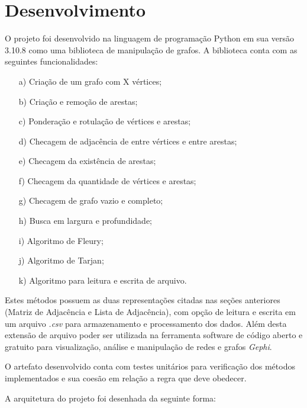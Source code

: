 \section{\esp Desenvolvimento}

O projeto foi desenvolvido na linguagem de programação Python em sua versão 3.10.8 como uma biblioteca de manipulação de grafos. A biblioteca conta com as seguintes funcionalidades:

\begin{enumerate} 
\item [a)]Criação de um grafo com X vértices;
\item [b)]Criação e remoção de arestas;
\item [c)]Ponderação e rotulação de vértices e arestas;
\item [d)]Checagem de adjacência de entre vértices e entre arestas;
\item [e)]Checagem da existência de arestas;
\item [f)]Checagem da quantidade de vértices e arestas;
\item [g)]Checagem de grafo vazio e completo;
\item [h)]Busca em largura e profundidade;
\item [i)]Algoritmo de Fleury;
\item [j)]Algoritmo de Tarjan;
\item [k)] Algoritmo para leitura e escrita de arquivo.
\end{enumerate}

Estes métodos possuem as duas representações citadas nas seções anteriores (Matriz de Adjacência e Lista de Adjacência), com opção de leitura e escrita em um arquivo \emph{.csv} para armazenamento e processamento dos dados. Além desta extensão de arquivo poder ser utilizada na ferramenta software de código aberto e gratuito para visualização, análise e manipulação de redes e grafos \emph{Gephi}.

O artefato desenvolvido conta com testes unitários para verificação dos métodos implementados e sua coesão em relação a regra que deve obedecer.

A arquitetura do projeto foi desenhada da seguinte forma:

